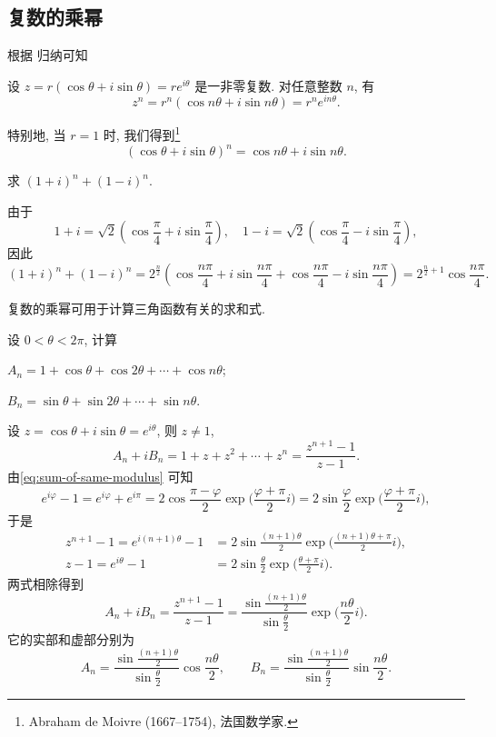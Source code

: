 \subsection{复数的乘幂}

根据 归纳可知
\begin{theorem}
  设 $z=r(\cos\theta+i\sin\theta)=re^{i\theta}$ 是一非零复数.
  对任意整数 $n$, 有
  \[
    z^n=r^n(\cos{n\theta}+i\sin{n\theta})
    =r^ne^{in\theta}.
  \]
\end{theorem}
特别地, 当 $r=1$ 时, 我们得到\footnote{%
  Abraham de Moivre (1667--1754), 法国数学家.
}
\[
  (\cos\theta+i\sin\theta)^n=\cos{n\theta}+i\sin{n\theta}.
\]

\begin{example}
  求 $(1+i)^n+(1-i)^n$.
\end{example}

\begin{solution}
  由于
  \[
    1+i=\sqrt2(\cos\frac\pi4+i\sin\frac\pi4),\quad
    1-i=\sqrt2(\cos\frac\pi4-i\sin\frac\pi4),
  \]
  因此
  \[
     (1+i)^n+(1-i)^n
    =2^{\frac n2}(\cos\frac{n\pi}4+i\sin\frac{n\pi}4 
      +\cos\frac{n\pi}4-i\sin\frac{n\pi}4)
    =2^{\frac n2+1}\cos\frac{n\pi}4.
  \]
\end{solution}

复数的乘幂可用于计算三角函数有关的求和式.
\begin{example}
  设 $0<\theta<2\pi$, 计算
  \begin{enumpar}[(i)]
    \item $A_n=1+\cos\theta+\cos{2\theta}+\cdots+\cos{n\theta}$;
    \item $B_n=\sin\theta+\sin{2\theta}+\cdots+\sin{n\theta}$.
  \end{enumpar}
\end{example}

\begin{solution}
  设 $z=\cos\theta+i\sin\theta=e^{i\theta}$, 则 $z\neq 1$,
  \[
    A_n+iB_n=1+z+z^2+\cdots+z^n=\frac{z^{n+1}-1}{z-1}.
  \]
  由\ref{eq:sum-of-same-modulus} 可知
  \[
    e^{i\varphi}-1=e^{i\varphi}+e^{i\pi}=2\cos\frac{\pi-\varphi}2\exp\bigl(\frac{\varphi+\pi}2i\bigr)
    =2\sin\frac\varphi2\exp\bigl(\frac{\varphi+\pi}2i\bigr),
  \]
  于是
  \begin{align*}
    z^{n+1}-1=e^{i(n+1)\theta}-1&=2\sin{\frac{(n+1)\theta}2}\exp\bigl(\frac{(n+1)\theta+\pi}2i\bigr),\\
    z-1=e^{i\theta}-1&=2\sin{\frac\theta2}\exp\bigl(\frac{\theta+\pi}2i\bigr).
  \end{align*}
  两式相除得到
  \[
    A_n+iB_n=\frac{z^{n+1}-1}{z-1}=\frac{\sin\frac{(n+1)\theta}2}{\sin\frac\theta2}\exp\bigl(\frac{n\theta}2i\bigr).
  \]
  它的实部和虚部分别为
  \[
    A_n=\frac{\sin\frac{(n+1)\theta}2}{\sin\frac\theta2}\cos\frac{n\theta}2,\qquad
    B_n=\frac{\sin\frac{(n+1)\theta}2}{\sin\frac\theta2}\sin\frac{n\theta}2.
  \]
\end{solution}

